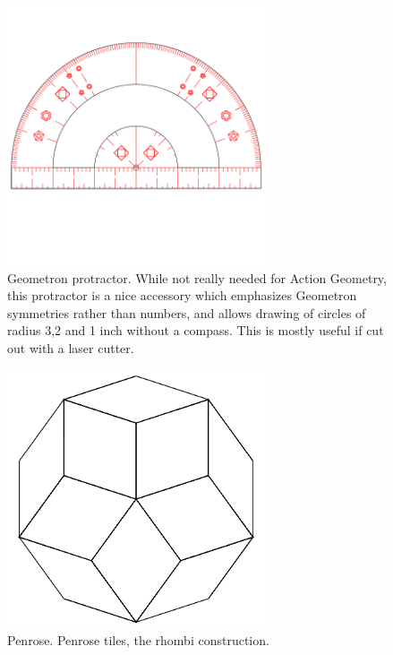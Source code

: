 \begin{figure}
	\centering
	\includegraphics[width=3in]{figures/actiongeometry/protractor.png}
	\caption[protractor]
	{Geometron protractor.  While not really needed for Action Geometry, this protractor is a nice accessory which emphasizes Geometron symmetries rather than numbers, and allows drawing of circles of radius 3,2 and 1 inch without a compass.  This is mostly useful if cut out with a laser cutter.}
\end{figure}


\begin{figure}
	\centering
	\includegraphics[width=3in]{figures/actiongeometry/penrose.png}
	\caption[penrose]
	{Penrose. Penrose tiles, the rhombi construction.}
\end{figure}

